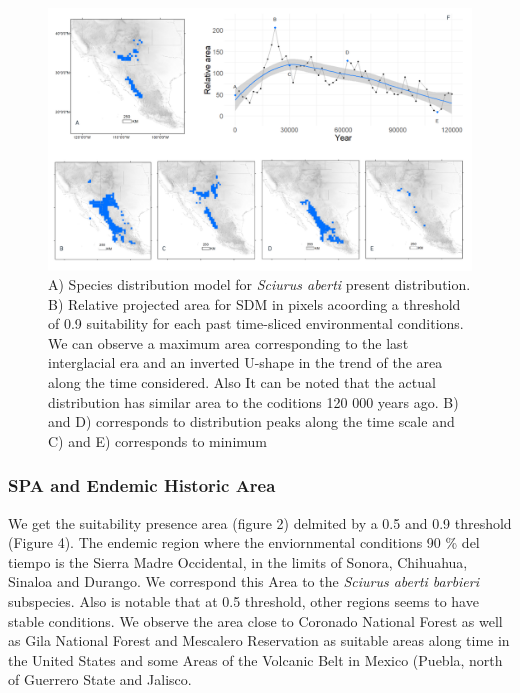 \documentclass[
]{article}
\begin{document}
\begin{figure}
\centering
\includegraphics[width=1\textwidth,height=\textheight]{all_figures/figure_3.png}
\caption{A) Species distribution model for \emph{Sciurus aberti} present
distribution. B) Relative projected area for SDM in pixels acoording a
threshold of 0.9 suitability for each past time-sliced environmental
conditions. We can observe a maximum area corresponding to the last
interglacial era and an inverted U-shape in the trend of the area along
the time considered. Also It can be noted that the actual distribution
has similar area to the coditions 120 000 years ago. B) and D)
corresponds to distribution peaks along the time scale and C) and E)
corresponds to minimum}
\end{figure}

\hypertarget{spa-and-endemic-historic-area}{%
\subsubsection{SPA and Endemic Historic
Area}\label{spa-and-endemic-historic-area}}

We get the suitability presence area (figure 2) delmited by a 0.5 and
0.9 threshold (Figure 4). The endemic region where the enviornmental
conditions 90 \% del tiempo is the Sierra Madre Occidental, in the
limits of Sonora, Chihuahua, Sinaloa and Durango. We correspond this
Area to the \emph{Sciurus aberti barbieri} subspecies. Also is notable
that at 0.5 threshold, other regions seems to have stable conditions. We
observe the area close to Coronado National Forest as well as Gila
National Forest and Mescalero Reservation as suitable areas along time
in the United States and some Areas of the Volcanic Belt in Mexico
(Puebla, north of Guerrero State and Jalisco.\\
\end{document}
